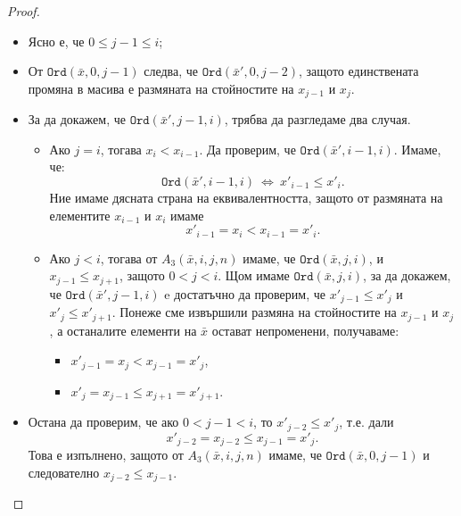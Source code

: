 \begin{proof}
\begin{description}
  \begin{itemize}
  \item 
    Ясно е, че $0 \leq j-1 \leq i$;
  \item
    От $\texttt{Ord}(\bar{x},0,j-1)$ следва, че $\texttt{Ord}(\bar{x}',0,j-2)$,
    защото единствената промяна в масива е размяната на стойностите
    на $x_{j-1}$ и $x_j$.
  \item
    За да докажем, че $\texttt{Ord}(\bar{x}',j-1,i)$, трябва да разгледаме два случая.
    \begin{itemize}
    \item
      Ако $j = i$, тогава $x_i < x_{i-1}$. Да проверим, че $\texttt{Ord}(\bar{x}',i-1,i)$.
      Имаме, че:
      \[\texttt{Ord}(\bar{x}',i-1,i)\ \iff\ x'_{i-1} \leq x'_{i}.\]
      Ние имаме дясната страна на еквивалентността, защото от размяната на елементите $x_{i-1}$ и $x_{i}$
      имаме \[x'_{i-1} = x_i < x_{i-1} = x'_{i}.\]
    \item
      Ако $j < i$, тогава от $A_3(\bar{x},i,j,n)$ имаме, че $\texttt{Ord}(\bar{x},j,i)$,
      и  $x_{j-1} \leq x_{j+1}$, защото $0 < j < i$.
      Щом имаме $\texttt{Ord}(\bar{x},j,i)$, за да докажем, че $\texttt{Ord}(\bar{x}',j-1,i)$ e достатъчно да проверим, че
      $x'_{j-1}\leq x'_{j}$ и $x'_j \leq x'_{j+1}$. Понеже сме извършили размяна на стойностите на $x_{j-1}$ и $x_j$,
      а останалите елементи на $\bar{x}$ остават непроменени, получаваме:
      \begin{itemize}
      \item 
        $ x'_{j-1} = x_j < x_{j-1} = x'_j$,
      \item
        $x'_{j} = x_{j-1} \leq x_{j+1} = x'_{j+1}$.
      \end{itemize}
    \end{itemize}
  \item
    Остана да проверим, че ако $0 < j - 1 < i$, то $x'_{j-2} \leq x'_{j}$, т.е. дали
    \[x'_{j-2} = x_{j-2} \leq x_{j-1} = x'_{j}.\] Това е изпълнено, защото от 
    $A_3(\bar{x},i,j,n)$ имаме, че $\texttt{Ord}(\bar{x},0,j-1)$ и следователно $x_{j-2} \leq x_{j-1}$.
  \end{itemize}
  

\end{description}
\end{proof}
